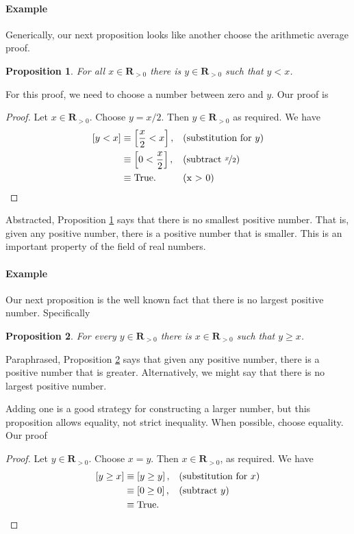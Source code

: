 \documentclass[12pt,fleqn]{article}
\newcommand{\reals}{\mathbf{R}}
\newcommand{\true}{\mathrm{True}}
\newenvironment{myproof}
  {\begin{shaded}\begin{proof}}
  {\end{proof}\end{shaded}}
\newtheorem{prop}{Proposition}
\newcounter{ex}\setcounter{ex}{0}
\newcommand{\ex}{%
\setcounter{ex}{\value{ex}+1}
\paragraph{Example \theex}}
\begin{document}
 \ex   Generically, our next proposition looks like another choose 
 the arithmetic average proof. 
      
    \begin{prop}   For all $x \in \reals_{>0}$ there is 
      $y \in \reals_{> 0}$ such that $y < x$.  \label{p5}
    \end{prop}
   
    For this proof,  we need to choose a  number between  zero and $y$. Our proof is
      \begin{myproof}  Let $x \in \reals_{>0}$. Choose $y = x/2$. Then $y \in \reals_{>0}$ as required. We have
         \begin{align*}
         \left[y < x \right] &\equiv \left[\frac{x}{2} < x \right], &&\text{(substitution for $y$)} \\
                                   &\equiv \left[0 < \frac{x}{2}  \right], &&\text{(subtract $\nicefrac{x}{2}$)} \\
                                   &\equiv \true.  &&\text{(x > 0)} \qedhere
      \end{align*}
      \end{myproof}
Abstracted, Proposition \ref{p5} says that there is no smallest positive number. That is, given any positive number, there is a 
positive number that is smaller.  This is an important property of the field of real numbers.
       
\ex Our next proposition is the well known fact that there is
no largest positive number. Specifically
       \begin{prop} For every $y \in \reals_{> 0}$ there is  
        $x \in \reals_{>0}$ such that $y \geq  x$. \label{p6}
      \end{prop}
      Paraphrased, Proposition \ref{p6} says that given any positive number, there is a positive number that is greater. Alternatively, we
      might say that there is no largest positive number. 
      
      Adding one is a good strategy for constructing a larger number, but this proposition
      allows equality, not strict inequality.  When possible, choose equality. Our proof
      
       \begin{myproof} Let $y \in \reals_{>0}$. Choose $x = y$. Then $x \in \reals_{>0}$, as 
        required. We have
       \begin{align*}
         \left[y \geq x  \right] &\equiv \left[y \geq  y \right], && \text{(substitution for $x$)} \\
                                      &\equiv \left[0 \geq 0 \right], &&\text{(subtract $y$)} \\
                                      &\equiv \true. && \qedhere
       \end{align*}
       
       \end{myproof}
\end{document}
